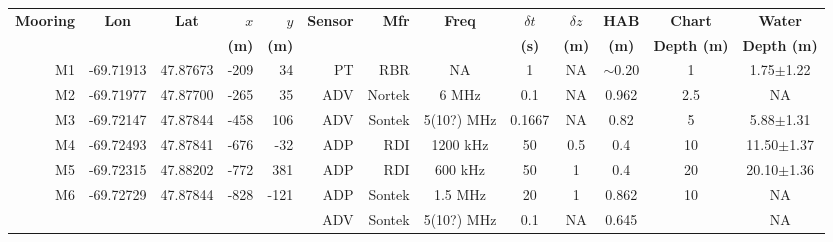 \begin{sidewaystable}\scriptsize
  \label{t:mooring_table}
  \centering
  \begin{tabular}{|r|c|c|r|r|r|r|c|c|c|c|c|c|} \hline
    {\bf Mooring}       & {\bf Lon}                  & {\bf Lat}                 & $x$                    & $y$                   & {\bf Sensor} &{\bf Mfr}   & {\bf Freq}&$\delta t$ &$\delta z$& {\bf HAB}  & {\bf Chart}        & {\bf Water}       \\
    ~                   &                            &                           & {\bf (m)}              & {\bf (m)}             &              &            &           & {\bf (s)} & {\bf (m)}& {\bf (m)}  & {\bf Depth (m)}    & {\bf Depth (m)}   \\\hline \hline
    M1                  & -69.71913                  & 47.87673                  & -209                   & 34                    & PT           & RBR        & NA        & 1         & NA       & $\sim0.20$ & 1                  &  1.75$\pm$1.22    \\\hline
    M2                  & -69.71977                  & 47.87700                  & -265                   & 35                    & ADV          & Nortek     & 6 MHz     & 0.1       & NA       & 0.962      & 2.5                &  NA               \\\hline %
    M3                  & -69.72147                  & 47.87844                  & -458                   & 106                   & ADV          & Sontek     & 5(10?) MHz& 0.1667    & NA       & 0.82       & 5                  &  5.88$\pm$1.31    \\\hline
    M4                  & -69.72493                  & 47.87841                  & -676                   & -32                   & ADP          & RDI        & 1200 kHz  & 50        & 0.5      & 0.4        & 10                 &  11.50$\pm$1.37   \\\hline
    M5                  & -69.72315                  & 47.88202                  & -772                   & 381                   & ADP          & RDI        & 600 kHz   & 50        & 1        & 0.4        & 20                 &  20.10$\pm$1.36   \\\hline
    \multirow{4}{*}{M6} & \multirow{4}{*}{-69.72729} & \multirow{4}{*}{47.87844} & \multirow{4}{*}{-828}  & \multirow{4}{*}{-121} & ADP          & Sontek     & 1.5 MHz   & 20        & 1        & 0.862      & \multirow{4}{*}{10}&  NA               \\ 
    ~                   &                            &                           &                        &                       & ADV          & Sontek     & 5(10?) MHz& 0.1       & NA       & 0.645      &                    &  NA               \\ 

\end{tabular}
\end{sidewaystable}
